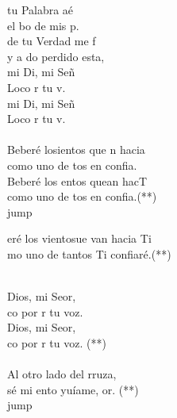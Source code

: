 \begin{cancion}[Hacia Ti][Ixcís]%
	tu Palabra aé\\
	el bo de mis p.\\
	de tu Verdad me f\\
	y a do perdido esta,\\
	mi Di, mi Señ\\
	Loco  r tu v. \\
	mi Di, mi Señ\\
	Loco  r tu v.\\
	\jump\\
	Beberé losientos que n hacia\\
	como uno de tos en  confia.\\
	Beberé los entos quean hacT\\
	como uno de tos en  confia.(**)\\jump\\
	\begin{chorus}%
	eré los vientosue van hacia Ti\\
	mo uno de tantos Ti confiaré.(**)\\
	\end{chorus}%
	\jump\\
	Dios, mi Seor,\\
	co por r tu voz.\\
	Dios, mi Seor,\\
	co por r tu voz. (**)\\
	\jump\\
	Al otro lado del rruza,\\
	sé mi ento yuíame, or. (**) \\jump\\
	\begin{chorus}%

\end{chorus}
\end{cancion}
